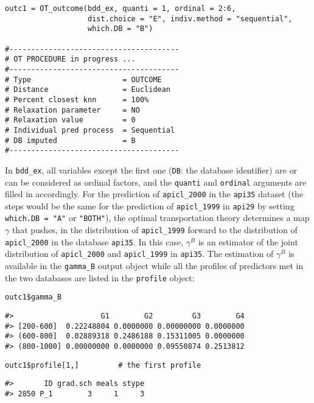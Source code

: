 \begin{verbatim}
outc1 = OT_outcome(bdd_ex, quanti = 1, ordinal = 2:6, 
                   dist.choice = "E", indiv.method = "sequential", 
                   which.DB = "B")

#---------------------------------------
# OT PROCEDURE in progress ...
#---------------------------------------
# Type                     = OUTCOME
# Distance                 = Euclidean
# Percent closest knn      = 100%
# Relaxation parameter     = NO
# Relaxation value         = 0
# Individual pred process  = Sequential
# DB imputed               = B
#---------------------------------------
\end{verbatim}

In \texttt{bdd\_ex}, all variables except the first one (\texttt{DB}: the database identifier) are or can be considered as ordinal factors, and the \texttt{quanti} and \texttt{ordinal} arguments are filled in accordingly. For the prediction of \texttt{apicl\_2000} in the \texttt{api35} dataset (the steps would be the same for the prediction of \texttt{apicl\_1999} in \texttt{api29} by setting \texttt{which.DB\ =\ "A"} or \texttt{"BOTH"}), the optimal transportation theory determines a map \(\gamma\) that pushes, in the distribution of \texttt{apicl\_1999} forward to the distribution of \texttt{apicl\_2000} in the database \texttt{api35}. In this case, \(\gamma^B\) is an estimator of the joint distribution of \texttt{apicl\_2000} and \texttt{apicl\_1999} in \texttt{api35}. The estimation of \(\gamma^B\) is available in the \texttt{gamma\_B} output object while all the profiles of predictors met in the two databases are listed in the \texttt{profile} object:

\begin{verbatim}
outc1$gamma_B
\end{verbatim}

\begin{verbatim}
#>                    G1        G2         G3        G4
#> [200-600]  0.22248804 0.0000000 0.00000000 0.0000000
#> (600-800]  0.02889318 0.2486188 0.15311005 0.0000000
#> (800-1000] 0.00000000 0.0000000 0.09550874 0.2513812
\end{verbatim}

\begin{verbatim}
outc1$profile[1,]         # the first profile
\end{verbatim}

\begin{verbatim}
#>       ID grad.sch meals stype
#> 2850 P_1        3     1     3
\end{verbatim}

